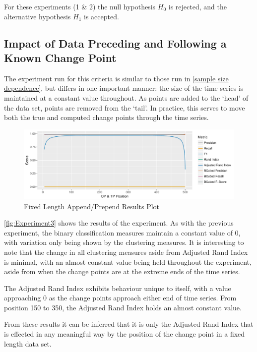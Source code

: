 \documentclass{uvamscse}	%
\begin{document}
For these experiments (1 \& 2) the null hypothesis $H_0$ is rejected, and the alternative hypothesis $H_1$ is accepted.

\subsection{Impact of Data Preceding and Following a Known Change Point}

The experiment run for this criteria is similar to those run in \autoref{sample size dependence}, but differs in one important manner: the size of the time series is maintained at a constant value throughout. As points are added to the `head' of the data set, points are removed from the `tail'. In practice, this serves to move both the true and computed change points through the time series.

\begin{figure}[h]
    \includegraphics[width=\textwidth]{figures/Experiment2}
    \caption{Fixed Length Append/Prepend Results Plot}
    \label{fig:Experiment3}
\end{figure}

\autoref{fig:Experiment3} shows the results of the experiment. As with the previous experiment, the binary classification measures maintain a constant value of $0$, with variation only being shown by the clustering measures. It is interesting to note that the change in all clustering measures aside from Adjusted Rand Index is minimal, with an almost constant value being held throughout the experiment, aside from when the change points are at the extreme ends of the time series.

The Adjusted Rand Index exhibits behaviour unique to itself, with a value approaching 0 as the change points approach either end of time series. From position 150 to 350, the Adjusted Rand Index holds an almost constant value.

From these results it can be inferred that it is only the Adjusted Rand Index that is effected in any meaningful way by the position of the change point in a fixed length data set.
\end{document}
